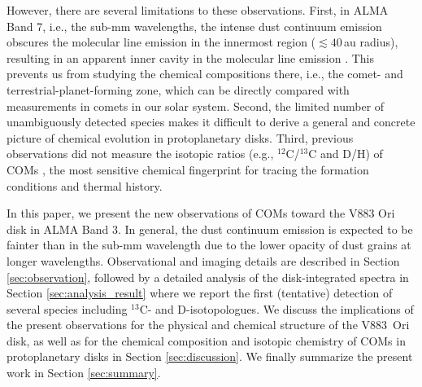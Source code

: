 \documentclass[linenumbers, twocolumn, twocolappendix, astrosymb, times]{aastex631}
\newcommand{\methanol}{CH$_3$OH\xspace}
\begin{document}
However, there are several limitations to these observations. First, in ALMA Band 7, i.e., the sub-mm wavelengths, the intense dust continuum emission obscures the molecular line emission in the innermost region ($\lesssim40$\,au radius), resulting in an apparent inner cavity in the molecular line emission \citep{vantHoff2018, Lee2019, Tobin2023}. This prevents us from studying the chemical compositions there, i.e., the comet- and terrestrial-planet-forming zone, which can be directly compared with measurements in comets in our solar system. Second, the limited number of unambiguously detected species \citep{Lee2019} makes it difficult to derive a general and concrete picture of chemical evolution in protoplanetary disks. Third, previous observations did not measure the isotopic ratios (e.g., $^{12}$C/$^{13}$C and D/H) of COMs \citep[except for the D/H ratio of \methanol;][]{Lee2019}, the most sensitive chemical fingerprint for tracing the formation conditions and thermal history.

In this paper, we present the new observations of COMs toward the V883 Ori disk in ALMA Band 3. In general, the dust continuum emission is expected to be fainter than in the sub-mm wavelength due to the lower opacity of dust grains at longer wavelengths. Observational and imaging details are described in Section \ref{sec:observation}, followed by a detailed analysis of the disk-integrated spectra in Section \ref{sec:analysis_result} where we report the first (tentative) detection of several species including $^{13}$C- and D-isotopologues. We discuss the implications of the present observations for the physical and chemical structure of the V883~Ori disk, as well as for the chemical composition and isotopic chemistry of COMs in protoplanetary disks in Section \ref{sec:discussion}. We finally summarize the present work in Section \ref{sec:summary}.

\end{document}
